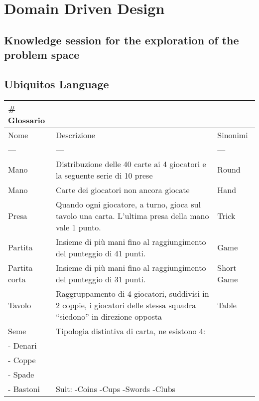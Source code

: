 \chapter{Domain Driven Design}
\label{ch:ddd} %

\section{Knowledge session for the exploration of the problem space}
\section{Ubiquitos Language}
\begin{table}[!ht]
    \centering
    \begin{tabular}{|l|l|l|}
    \hline
        \# Glossario & ~ & ~ \\ \hline
        Nome & Descrizione & Sinonimi \\ \hline
        --- & --- & --- \\ \hline
        Mano & Distribuzione delle 40 carte ai 4 giocatori e la seguente serie di 10 prese & Round \\ \hline
        Mano & Carte dei giocatori non ancora giocate & Hand \\ \hline
        Presa & Quando ogni giocatore, a turno, gioca sul tavolo una carta. L’ultima presa della mano vale 1 punto. & Trick \\ \hline
        Partita & Insieme di più mani fino al raggiungimento del punteggio di 41 punti. & Game \\ \hline
        Partita corta & Insieme di più mani fino al raggiungimento del punteggio di 31 punti. & Short Game \\ \hline
        Tavolo & Raggruppamento di 4 giocatori, suddivisi in 2 coppie, i giocatori delle stessa squadra “siedono” in direzione opposta & Table \\ \hline
        Seme & Tipologia distintiva di carta, ne esistono 4: & ~ \\ \hline
        - Denari & ~ & ~ \\ \hline
        - Coppe & ~ & ~ \\ \hline
        - Spade & ~ & ~ \\ \hline
        - Bastoni & Suit:                                                -Coins                                            -Cups                                             -Swords                                         -Clubs & ~ \\ \hline

\end{tabular}
\end{table}
